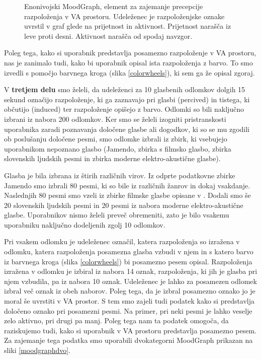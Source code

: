 \documentclass[a4paper, 12pt]{book}
\begin{document}
{\begin{figure}[ht]
\caption{Enonivojski MoodGraph, element za zajemanje precepcije razpoloženja v VA prostoru. Udeleženec je razpoloženjske oznake uvrstil v graf glede na prijetnost in aktivnost. Prijetnost narašča iz leve proti desni. Aktivnost narašča od spodaj navzgor. }
\label{moodgraph}
\end{figure}

Poleg tega, kako si uporabnik predstavlja posamezno razpoloženje v VA prostoru, nas je zanimalo tudi, kako bi uporabnik opisal ista razpoloženja z barvo. To smo izvedli s pomočjo barvnega kroga (slika \ref{colorwheels}), ki sem ga že opisal zgoraj. 

V \textbf{tretjem delu} smo želeli, da udeleženci za 10 glasbenih odlomkov dolgih 15 sekund označijo razpoloženje, ki ga zaznavajo pri glasbi (percived) in tistega, ki občutijo (induced) ter razpoloženje opišejo z barvo. Odlomki so bili naključno izbrani iz nabora 200 odlomkov. Ker smo se želeli izogniti pristranskosti uporabnika zaradi poznavanja določene glasbe ali dogodkov, ki so se mu zgodili ob poslušanju določene pesmi, smo odlomke izbrali iz zbirk, ki vsebujejo uporabnikom nepoznano glasbo (Jamendo, zbirka s filmsko glasbo, zbirka slovenskih ljudskih pesmi in zbirka moderne elektro-akustične glasbe).  

Glasba je bila izbrana iz štirih različnih virov. Iz odprte podatkovne zbirke Jamendo smo izbrali 80 pesmi, ki so bile iz različnih žanrov in dokaj vsakdanje. Naslednjih 80 pesmi smo vzeli iz zbirke filmske glasbe opisane v \cite{Eerola2010}. Dodali smo še 20 slovenskih ljudskih pesmi in 20 pesmi iz nabora moderne elektro-akustične glasbe. Uporabnikov nismo želeli preveč obremeniti, zato je bilo vsakemu uporabniku naključno dodeljenih zgolj 10 odlomkov.

Pri vsakem odlomku je udeleženec označil, katera razpoloženja so izražena v odlomku, katera razpoloženja posamezna glasba vzbudi v njem in s katero barvo iz barvnega kroga (slika \ref{colorwheels}) bi posamezno pesem opisal. Razpoloženja izražena v odlomku je izbiral iz nabora 14 oznak, razpoloženja, ki jih je glasba pri njem vzbudila, pa iz nabora 10 oznak. Udeleženec je lahko za posamezen odlomek izbral več oznak iz obeh naborov. Poleg tega, da je izbral posamezno oznako jo je moral še uvrstiti v VA prostor. S tem smo zajeli tudi podatek kako si predstavlja določeno oznako pri posamezni pesmi. Na primer, pri neki pesmi je lahko veselje zelo aktivno, pri drugi pa manj. Poleg tega nam ta podatek omogoča, da raziskujemo tudi, kako si uporabnik v VA prostoru predstavlja posamezno pesem. Za zajemanje tega podatka smo uporabili dvokategorni MoodGraph prikazan na sliki \ref{moodgraphdvo}.

}
\end{document}
